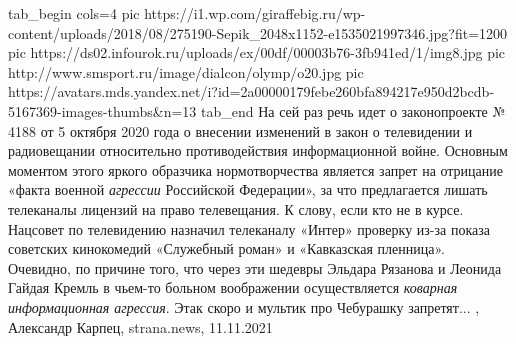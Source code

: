 \ifcmt
  tab_begin cols=4
		 pic https://i1.wp.com/giraffebig.ru/wp-content/uploads/2018/08/275190-Sepik_2048x1152-e1535021997346.jpg?fit=1200%
		 pic https://ds02.infourok.ru/uploads/ex/00df/00003b76-3fb941ed/1/img8.jpg
     pic http://www.smsport.ru/image/dialcon/olymp/o20.jpg
     pic https://avatars.mds.yandex.net/i?id=2a00000179febe260bfa894217e950d2bcdb-5167369-images-thumbs&n=13
  tab_end
\fi
На сей раз речь идет о законопроекте № 4188 от 5 октября 2020 года о внесении
изменений в закон о телевидении и радиовещании относительно противодействия
информационной войне. Основным моментом этого яркого образчика нормотворчества
является запрет на отрицание «факта военной \emph{агрессии} Российской
Федерации», за что предлагается лишать телеканалы лицензий на право
телевещания.  К слову, если кто не в курсе. Нацсовет по телевидению назначил
телеканалу «Интер» проверку из-за показа советских кинокомедий «Служебный
роман» и «Кавказская пленница». Очевидно, по причине того, что через эти
шедевры Эльдара Рязанова и Леонида Гайдая Кремль в чьем-то больном воображении
осуществляется \emph{коварная информационная агрессия}. Этак скоро и мультик
про Чебурашку запретят...
, 
Александр Карпец, strana.news, 11.11.2021
